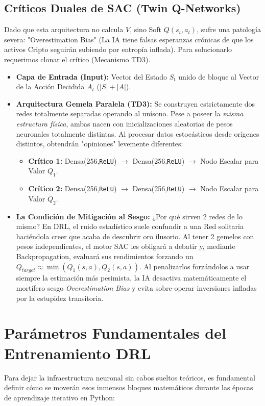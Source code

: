 \documentclass[11pt,a4paper]{article}
\begin{document}
\subsection{Críticos Duales de SAC (Twin Q-Networks)}
Dado que esta arquitectura no calcula $V$, sino Soft $Q(s_t, a_t)$, sufre una patología severa: "Overestimation Bias" (La IA tiene falsas esperanzas crónicas de que los activos Cripto seguirán subiendo por entropía inflada). Para solucionarlo requerimos clonar el crítico (Mecanismo TD3).
\begin{itemize}
    \item \textbf{Capa de Entrada (Input):} Vector del Estado $S_t$ unido de bloque al Vector de la Acción Decidida $A_t$ ($|S| + |A|$).
    \item \textbf{Arquitectura Gemela Paralela (TD3):} Se construyen estrictamente dos redes totalmente separadas operando al unísono. Pese a poseer la \textit{misma estructura física}, ambas nacen con inicializaciones aleatorias de pesos neuronales totalmente distintas. Al procesar datos estocásticos desde orígenes distintos, obtendrán "opiniones" levemente diferentes:
    \begin{itemize}
        \item \textbf{Crítico 1:} Densa(256,\texttt{ReLU}) $\rightarrow$ Densa(256,\texttt{ReLU}) $\rightarrow$ Nodo Escalar para Valor $Q_1$.
        \item \textbf{Crítico 2:} Densa(256,\texttt{ReLU}) $\rightarrow$ Densa(256,\texttt{ReLU}) $\rightarrow$ Nodo Escalar para Valor $Q_2$.
    \end{itemize}
    \item \textbf{La Condición de Mitigación al Sesgo:} ¿Por qué sirven 2 redes de lo mismo? En DRL, el ruido estadístico suele confundir a una Red solitaria haciéndola creer que acaba de descubrir oro ilusorio. Al tener 2 gemelos con pesos independientes, el motor SAC les obligará a debatir y, mediante Backpropagation, evaluará sus rendimientos forzando un $Q_{target} \approx \min(Q_1(s,a), Q_2(s,a))$. Al penalizarlos forzándolos a usar siempre la estimación más pesimista, la IA desactiva matemáticamente el mortífero sesgo \textit{Overestimation Bias} y evita sobre-operar inversiones infladas por la estupidez transitoria.
\end{itemize}

\section{Parámetros Fundamentales del Entrenamiento DRL}
Para dejar la infraestructura neuronal sin cabos sueltos teóricos, es fundamental definir cómo se moverán esos inmensos bloques matemáticos durante las épocas de aprendizaje iterativo en Python:
\end{document}
